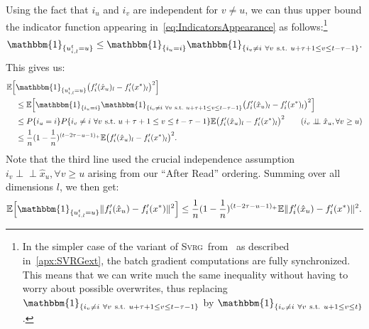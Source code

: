 \documentclass[twoside]{article}
\newcommand{\overlap}{\tau}
\newcommand{\E}{\mathbb{E}}
\newcommand{\ind}{\mathbbm{1}}
\newcommand{\SVRG}{\textsc{Svrg}}
\begin{document}
Using the fact that $i_u$ and $i_v$ are independent for $v \neq u$, we can thus upper bound the indicator function appearing in~\eqref{eq:IndicatorsAppearance} as follows:\footnote{\label{footnote}In the simpler case of the variant of \SVRG\ from~\citet{qsaga} as described in~\ref{apx:SVRGext}, the batch gradient computations are fully synchronized. This means that we can write much the same inequality without having to worry about possible overwrites, thus replacing  $\ind_{\{i_v \neq i\ \forall v\ \text{s.t.}\ u+\overlap+1 \leq v \leq t-\overlap-1\}}$ by $\ind_{\{i_v \neq i\ \forall v\ \text{s.t.}\ u+1 \leq v \leq t\}}$.}
\begin{align}\label{eq:indicatrices}
\ind_{\{u_{i,l}^t = u\}} 
\leq \ind_{\{i_u=i\}} 
	 \ind_{\{i_v \neq i\ \forall v\ \text{s.t.}\ u+\overlap+1 \leq v \leq t-\overlap-1\}} .
\end{align}
This gives us:
\begin{align}
\E \Big[ &\ind_{\{u_{i,l}^t = u\}} \big(f'_i(\hat x_u)_l-f'_i(x^*)_l\big)^2 \Big]
\nonumber \\ 
&\leq \E \Big[\ind_{\{i_u=i\}} 
	\ind_{\{i_v \neq i\ \forall v\ \text{s.t.}\ u+\overlap+1 \leq v \leq t-\overlap-1\}} \big(f'_i(\hat x_u)_l-f'_i(x^*)_l\big)^2\Big]
\nonumber \\ 
&\leq P\{i_u=i\}
	P\{i_v \neq i\ \forall v\ \text{s.t.}\ u+\overlap+1 \leq v \leq t-\overlap-1\}
	\E\big(f'_i(\hat x_u)_l-f'_i(x^*)_l\big)^2
\tag*{($i_v \perp\!\!\! \perp \hat x_u, \forall v \geq u$)} \nonumber \\ 
&\leq \frac{1}{n}(1 - \frac{1}{n})^{(t-2\overlap-u -1)_+}
	\E\big(f'_i(\hat x_u)_l-f'_i(x^*)_l\big)^2 .
\end{align}
Note that the third line used the crucial independence assumption $i_v \perp\!\!\! \perp \hat x_u, \forall v \geq u$ arising from our ``After Read'' ordering.
Summing over all dimensions $l$, we then get:
\begin{align}
\E \Big[ \ind_{\{u_{i,l}^t = u\}} \|f'_i(\hat x_u)-f'_i(x^*)\|^2 \Big]
\leq \frac{1}{n}(1 - \frac{1}{n})^{(t-2\overlap-u-1)_+}
	\E \|f'_i(\hat x_u)-f'_i(x^*)\|^2 .
\end{align}
\end{document}
